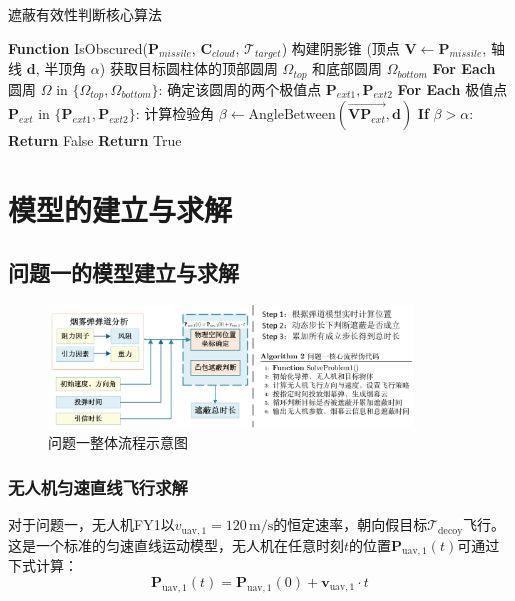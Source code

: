 \documentclass[fontset=SimSun]{ctexart}
\begin{document}
\begin{algorithm}[H]
\caption{遮蔽有效性判断核心算法}
\begin{algorithmic}[1]
\STATE \textbf{Function} IsObscured($\mathbf{P}_{missile}$, $\mathbf{C}_{cloud}$, $\mathcal{T}_{target}$)
\STATE   构建阴影锥 (顶点 $\mathbf{V} \leftarrow \mathbf{P}_{missile}$, 轴线 $\mathbf{d}$, 半顶角 $\alpha$)
\STATE   获取目标圆柱体的顶部圆周 $\Omega_{top}$ 和底部圆周 $\Omega_{bottom}$
\STATE   \textbf{For Each} 圆周 $\Omega$ in $\{\Omega_{top}, \Omega_{bottom}\}$:
\STATE     \quad 确定该圆周的两个极值点 $\mathbf{P}_{ext1}, \mathbf{P}_{ext2}$
\STATE     \quad \textbf{For Each} 极值点 $\mathbf{P}_{ext}$ in $\{\mathbf{P}_{ext1}, \mathbf{P}_{ext2}\}$:
\STATE     \qquad   计算检验角 $\beta \leftarrow \text{AngleBetween}(\vec{\mathbf{V}\mathbf{P}_{ext}}, \mathbf{d})$
\STATE     \qquad   \textbf{If} $\beta > \alpha$:
\STATE     \qquad     \quad \textbf{Return} False  
\STATE   \textbf{Return} True  
\end{algorithmic}
\end{algorithm}
\section{模型的建立与求解}
\subsection{问题一的模型建立与求解}

\begin{figure}[H]
    \centering
    \includegraphics[width=0.86\textwidth]{7.问题1流程图.png}
    \caption{问题一整体流程示意图}
    \label{fig:obscuration_cases}
\end{figure}


\subsubsection{无人机匀速直线飞行求解}
对于问题一，无人机FY1以$v_{\text{uav},1} = 120 \, \text{m/s}$的恒定速率，朝向假目标$\mathcal{T}_{\text{decoy}}$飞行。这是一个标准的匀速直线运动模型，无人机在任意时刻$t$的位置$\mathbf{P}_{\text{uav},1}(t)$可通过下式计算：
\begin{equation}
    \mathbf{P}_{\text{uav},1}(t) = \mathbf{P}_{\text{uav},1}(0) + \mathbf{v}_{\text{uav},1} \cdot t
\end{equation}
\end{document}
